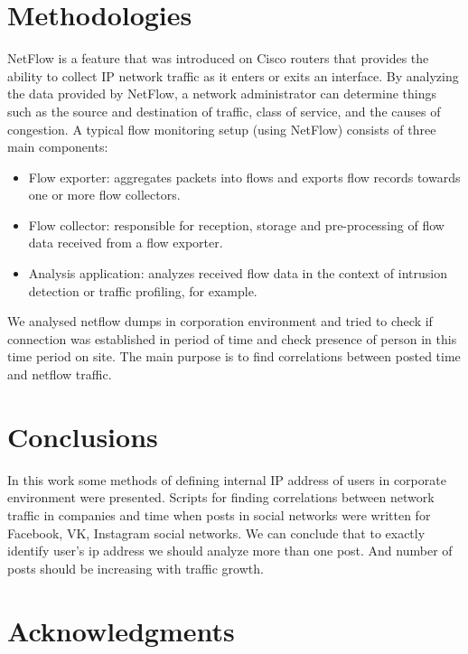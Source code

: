 \documentclass[12pt,a4paper]{report}
\begin{document}
\section{Methodologies}
NetFlow is a feature that was introduced on Cisco routers that provides the ability to collect IP network traffic as it enters or exits an interface. By analyzing the data provided by NetFlow, a network administrator can determine things such as the source and destination of traffic, class of service, and the causes of congestion. A typical flow monitoring setup (using NetFlow) consists of three main components:\cite{methodologies1}
\begin{itemize}
	\item{Flow exporter: aggregates packets into flows and exports flow records towards one or more flow collectors.}
	\item{Flow collector: responsible for reception, storage and pre-processing of flow data received from a flow exporter.}
	\item{Analysis application: analyzes received flow data in the context of intrusion detection or traffic profiling, for example.}
\end{itemize}

We analysed netflow dumps in corporation environment and tried to check if connection was established in period of time and check presence of person in this time period on site. The main purpose is to find correlations between posted time and netflow traffic.






\section{Conclusions}
In this work some methods of defining internal IP address of users in corporate environment were presented. Scripts for finding correlations between network traffic in companies and time when posts in social networks were written for Facebook, VK, Instagram social networks. We can conclude that to exactly identify user's ip address we should analyze more than one post. And number of posts should be increasing with traffic growth.
\section{Acknowledgments}

\end{document}
